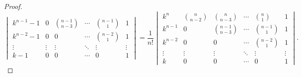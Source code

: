 \documentclass[class=nhvh-linear-algebra,crop=false]{standalone}
\begin{document}
\begin{proof}
\[\begin{vmatrix}
            k^{n-1} - 1 & 0              & \binom{n-1}{n-3} & \cdots & \binom{n-1}{1} & 1      \\
            k^{n-2} - 1 & 0              & 0                & \cdots & \binom{n-2}{1} & 1      \\
            \vdots      & \vdots         & \vdots           & \ddots & \vdots         & \vdots \\
            k - 1       & 0              & 0                & \cdots & 0              & 1
        \end{vmatrix}
        = \dfrac{1}{n!}
        \begin{vmatrix}
            k^{n}   & \binom{n}{n-2} & \binom{n}{n-3}   & \cdots & \binom{n}{1}   & 1      \\
            k^{n-1} & 0              & \binom{n-1}{n-3} & \cdots & \binom{n-1}{1} & 1      \\
            k^{n-2} & 0              & 0                & \cdots & \binom{n-2}{1} & 1      \\
            \vdots  & \vdots         & \vdots           & \ddots & \vdots         & \vdots \\
            k       & 0              & 0                & \cdots & 0              & 1
        \end{vmatrix}.
    \]
\end{proof}
\end{document}
